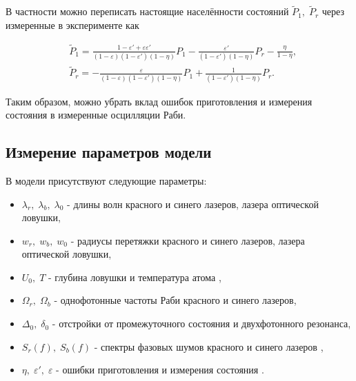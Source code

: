 В частности можно переписать настоящие населённости состояний $\tilde{P}_1, \; \tilde{P}_r$ через измеренные в эксперименте как 

\begin{equation}
	\begin{aligned}
		& \tilde{P}_1=\frac{1-\varepsilon'+\varepsilon\varepsilon'}{\left(1-\varepsilon\right)\left(1-\varepsilon'\right)\left(1-\eta\right)}P_1-\frac{\varepsilon'}{\left(1-\varepsilon'\right)\left(1-\eta\right)}P_r-\frac{\eta}{1-\eta}, \\ 
		& \tilde{P}_r=-\frac{\varepsilon}{\left(1-\varepsilon\right)\left(1-\varepsilon'\right)\left(1-\eta\right)}P_1+\frac{1}{\left(1-\varepsilon'\right)\left(1-\eta\right)}P_r.	
	\end{aligned}
\end{equation}

Таким образом, можно убрать вклад ошибок приготовления и измерения состояния в измеренные осцилляции Раби. 

\subsection{Измерение параметров модели}

В модели присутствуют следующие параметры:

\begin{itemize}
	\item $\lambda_r, \; \lambda_b, \; \lambda_0$ - длины волн красного и синего лазеров, лазера оптической ловушки, 
	\item $w_r, \; w_b, \; w_0$ - радиусы перетяжки красного и синего лазеров, лазера оптической ловушки, 
	\item $U_0, \; T$ - глубина ловушки и температура атома \cite{Browayes,Tuchendler2008EnergyDA}, 
	\item $\Omega_r, \; \Omega_b$ - однофотонные частоты Раби красного и синего лазеров,
	\item $\Delta_0, \; \delta_0$ - отстройки от промежуточного состояния и двухфотонного резонанса,
	\item $S_r(f), \; S_b(f)$ - спектры фазовых шумов красного и синего лазеров \cite{Saffman_Noise},
	\item $\eta, \; \varepsilon', \; \varepsilon$ - ошибки приготовления и измерения состояния \cite{Browayes}.
\end{itemize}

